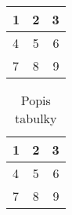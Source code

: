 \documentclass{book}
\begin{document}
\begin{tabular}{| l  | c | r | }
  1 & 2 & 3 \\
  \hline
  4 & 5 & 6 \\
  7 & 8 & 9 \\
\end{tabular}

\begin{table}
\centering
\caption{Popis tabulky}
\begin{tabular}{ l   c  r  }
  1 & 2 & 3 \\
  \hline
  4 & 5 & 6 \\
  7 & 8 & 9 \\
\end{tabular}
\label{mojatabulka}
\end{table}
\end{document}
